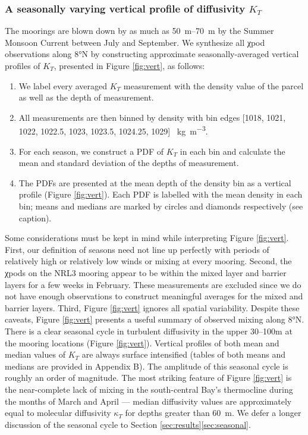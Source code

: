\documentclass[twocol]{ametsoc}
\begin{document}
\subsubsection*{A seasonally varying vertical profile of diffusivity \(K_T\)}
\label{sec:org56f20f8}
\label{sec:profile}

The moorings are blown down by as much as \SIrange{50}{70}{m} by the Summer Monsoon Current between July and September.
We synthesize all χpod observations along 8°N by constructing approximate seasonally-averaged vertical profiles of \(K_T\), presented in Figure \ref{fig:vert}, as follows:
\begin{enumerate}
\item We label every averaged \(K_T\) measurement with the density value of the parcel as well as the depth of measurement.
\item All measurements are then binned by density with bin edges [1018, 1021, 1022, 1022.5, 1023, 1023.5, 1024.25, 1029] \SI{}{\kg\per\m\cubed}.
\item For each season, we construct a PDF of \(K_T\) in each bin and calculate the mean and standard deviation of the depths of measurement.
\item The PDFs are presented at the mean depth of the density bin as a vertical profile (Figure \ref{fig:vert}). Each PDF is labelled with the mean density in each bin; means and medians are marked by circles and diamonds respectively (see caption).
\end{enumerate}
Some considerations must be kept in mind while interpreting Figure \ref{fig:vert}.
First, our definition of seasons need not line up perfectly with periods of relatively high or relatively low winds or mixing at every mooring.
Second, the χpods on the NRL3 mooring appear to be within the mixed layer and barrier layers for a few weeks in February.
These measurements are excluded since we do not have enough observations to construct meaningful averages for the mixed and barrier layers.
Third, Figure \ref{fig:vert} ignores all spatial variability.
Despite these caveats, Figure \ref{fig:vert} presents a useful summary of observed mixing along 8°N.
There is a clear seasonal cycle in turbulent diffusivity in the upper 30--100m at the mooring locations (Figure \ref{fig:vert}).
Vertical profiles of both mean and median values of \(K_T\) are always surface intensified (tables of both means and medians are provided in Appendix B).
The amplitude of this seasonal cycle is roughly an order of magnitude.
The most striking feature of Figure \ref{fig:vert} is the near-complete lack of mixing in the south-central Bay's thermocline during the months of March and April --- median diffusivity values are approximately equal to molecular diffusivity \(κ_T\) for depths greater than \SI{60}{m}.
We defer a longer discussion of the seasonal cycle to Section \ref{sec:results}\ref{sec:seasonal}.
\end{document}
